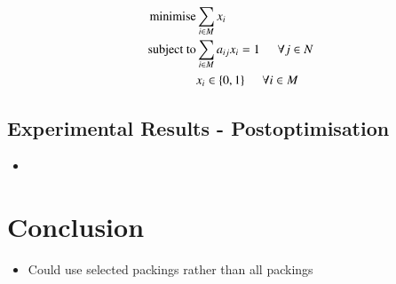 \documentclass{elsarticle}
\begin{document}
\begin{align*}
\text{minimise} &\sum_{i \in M} x_i \\
\text{subject to} &\sum_{i \in M} a_{ij} x_i = 1 \hspace{5mm} \forall j \in N \\
&x_i \in \{0,1\} \hspace{5mm} \forall i \in M
\end{align*}

\subsection{Experimental Results - Postoptimisation}
\label{sub:exppostopt}

{\color{myGreen}
\begin{itemize}[leftmargin=*]
	\item
\end{itemize}
}

\section{Conclusion}
\label{sec:conclusion}

{\color{Orchid}
\begin{itemize}[leftmargin=*]
	\item Could use selected packings rather than all packings
\end{itemize}
}

	



\end{document}

